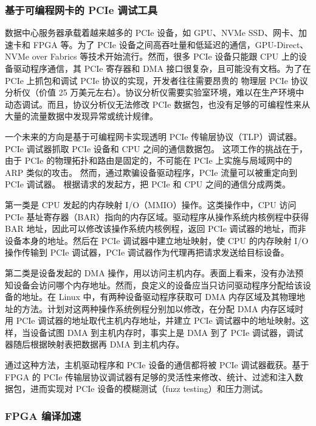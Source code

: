 \subsubsection{基于可编程网卡的 PCIe 调试工具}
\label{future:pcie-debugger}

数据中心服务器承载着越来越多的 PCIe 设备，如 GPU、NVMe SSD、网卡、加速卡和 FPGA 等。为了 PCIe 设备之间高吞吐量和低延迟的通信，GPU-Direct、NVMe over Fabrics 等技术开始流行。然而，很多 PCIe 设备只能跟 CPU 上的设备驱动程序通信，其 PCIe 寄存器和 DMA 接口很复杂，且可能没有文档。为了在 PCIe 上抓包和调试 PCIe 协议的实现，开发者往往需要昂贵的 物理层 PCIe 协议分析仪（价值 25 万美元左右）。协议分析仪需要实验室环境，难以在生产环境中动态调试。而且，协议分析仪无法修改 PCIe 数据包，也没有足够的可编程性来从大量的流量数据中发现异常或统计规律。

一个未来的方向是基于可编程网卡实现透明 PCIe 传输层协议（TLP）调试器。PCIe 调试器抓取 PCIe 设备和 CPU 之间的通信数据包。
这项工作的挑战在于，由于 PCIe 的物理拓扑和路由是固定的，不可能在 PCIe 上实施与局域网中的 ARP 类似的攻击。
然而，通过欺骗设备驱动程序，PCIe 流量可以被重定向到 PCIe 调试器。
根据请求的发起方，把 PCIe 和 CPU 之间的通信分成两类。

第一类是 CPU 发起的内存映射 I/O（MMIO）操作。这类操作中，CPU 访问 PCIe 基址寄存器（BAR）指向的内存区域。驱动程序从操作系统内核例程中获得 BAR 地址，因此可以修改该操作系统内核例程，返回 PCIe 调试器的地址，而非设备本身的地址。然后在 PCIe 调试器中建立地址映射，使 CPU 的内存映射 I/O 操作传输到 PCIe 调试器，PCIe 调试器作为代理再把请求发送给目标设备。

第二类是设备发起的 DMA 操作，用以访问主机内存。表面上看来，没有办法预知设备会访问哪个内存地址。然而，良定义的设备应当只访问驱动程序分配给该设备的地址。在 Linux 中，有两种设备驱动程序获取可 DMA 内存区域及其物理地址的方法。计划对这两种操作系统例程分别加以修改，在分配 DMA 内存区域时用 PCIe 调试器的地址取代主机内存地址，并建立 PCIe 调试器中的地址映射。这样，当设备试图 DMA 到主机内存时，事实上是 DMA 到了 PCIe 调试器，调试器随后根据映射表把数据再 DMA 到主机内存。

通过这种方法，主机驱动程序和 PCIe 设备的通信都将被 PCIe 调试器截获。基于 FPGA 的 PCIe 传输层协议调试器有足够的灵活性来修改、统计、过滤和注入数据包，进而实现对 PCIe 设备的模糊测试（fuzz testing）和压力测试。


\subsubsection{FPGA 编译加速}
\label{future:fpga-compile}

